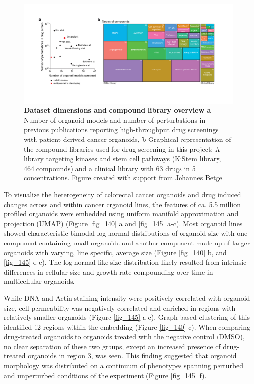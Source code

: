 \begin{flushleft}
\begin{figure}[h]
\centering
\includegraphics[width=\textwidth,
                height=\textheight,
                keepaspectratio]{figures/promise/pdf/fig_1_3.pdf}
\caption{\textbf{Dataset dimensions and compound library overview a} Number of organoid models and number of perturbations in previous publications reporting high-throughput drug screenings with patient derived cancer organoids, \textbf{b} Graphical representation of the compound libraries used for drug screening in this project: A library targeting kinases and stem cell pathways (KiStem library, 464 compounds) and a clinical library with 63 drugs in 5 concentrations. Figure created with support from Johannes Betge}
\label{fig_137}
\end{figure}

To visualize the heterogeneity of colorectal cancer organoids and drug induced changes across and within cancer organoid lines, the features of ca. 5.5 million profiled organoids were embedded using uniform manifold approximation and projection (UMAP) (Figure \ref{fig_140} a and \ref{fig_145} a-c). Most organoid lines showed characteristic bimodal log-normal distributions of organoid size with one component containing small organoids and another component made up of larger organoids with varying, line specific, average size (Figure \ref{fig_140} b, and \ref{fig_145} d-e). The log-normal-like size distribution likely resulted from intrinsic differences in cellular size and growth rate compounding over time in multicellular organoids. 

\smallbreak
While DNA and Actin staining intensity were positively correlated with organoid size, cell permeability was negatively correlated and enriched in regions with relatively smaller organoids (Figure \ref{fig_145} a-c). Graph-based clustering of this identified 12 regions within the embedding (Figure \ref{fig_140} c). When comparing drug-treated organoids to organoids treated with the negative control (DMSO), no clear separation of these two groups, except an increased presence of drug-treated organoids in region 3,  was seen. This finding suggested that organoid morphology was distributed on a continuum of phenotypes spanning perturbed and unperturbed conditions of the experiment (Figure \ref{fig_145} f). 


\end{flushleft}
